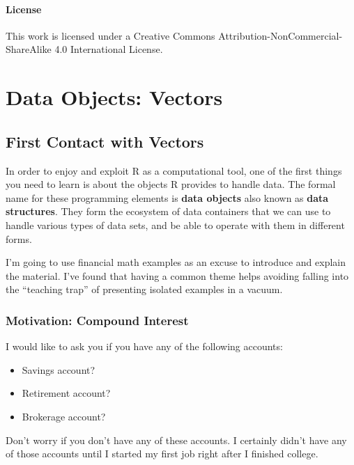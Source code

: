 \documentclass[
]{book}
\begin{document}
\hypertarget{license}{%
\subsection*{License}\label{license}}

This work is licensed under a Creative Commons Attribution-NonCommercial-ShareAlike 4.0 International License.

\hypertarget{part-data-objects-vectors}{%
\part{Data Objects: Vectors}\label{part-data-objects-vectors}}

\hypertarget{vectors1}{%
\chapter{First Contact with Vectors}\label{vectors1}}

In order to enjoy and exploit R as a computational tool, one of the first
things you need to learn is about the objects R provides to handle data.
The formal name for these programming elements is \textbf{data objects} also known as
\textbf{data structures}. They form the ecosystem of data containers that we can use
to handle various types of data sets, and be able to operate with them in
different forms.

I'm going to use financial math examples as an excuse to introduce and explain
the material. I've found that having a common theme helps avoiding falling
into the ``teaching trap'' of presenting isolated examples in a vacuum.

\hypertarget{motivation-compound-interest}{%
\section{Motivation: Compound Interest}\label{motivation-compound-interest}}

I would like to ask you if you have any of the following accounts:

\begin{itemize}
\item
  Savings account?
\item
  Retirement account?
\item
  Brokerage account?
\end{itemize}

Don't worry if you don't have any of these accounts. I certainly didn't have
any of those accounts until I started my first job right after I finished college.
\end{document}
